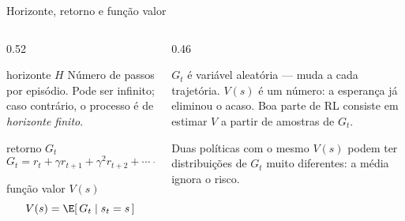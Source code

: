 \documentclass[aspectratio=169, 11pt]{beamer}
\begin{document}
\begin{frame}{Horizonte, retorno e função valor}
  \begin{columns}[T]
    \begin{column}{0.52\textwidth}
      \begin{defbox}[fontupper=\small]{horizonte $H$}
        Número de passos por episódio. Pode ser infinito; caso contrário, o processo é
        de \emph{horizonte finito}.
      \end{defbox}
      \begin{defbox}[fontupper=\small]{retorno $G_t$}
        \vspace{-1.1em}
        \[
          G_t = r_t + \gamma r_{t+1} + \gamma^2 r_{t+2} + \cdots + \gamma^{H-1} r_{t+H-1}
        \]
        \vspace{-1.6em}
      \end{defbox}
      \begin{defbox}[fontupper=\small]{função valor $V(s)$}
        \vspace{-1.1em}
        \[ V(s) = \E[\, G_t \mid s_t = s \,] \]
        \vspace{-1.6em}
      \end{defbox}
    \end{column}
    \begin{column}{0.46\textwidth}
      \begin{ideiabox}
        $G_t$ é variável \alert{aleatória} --- muda a cada trajetória. $V(s)$ é um
        \alert{número}: a esperança já eliminou o acaso. Boa parte de RL consiste em
        estimar $V$ a partir de amostras de $G_t$.
      \end{ideiabox}
      \begin{alertabox}
        Duas políticas com o mesmo $V(s)$ podem ter distribuições de $G_t$ muito
        diferentes: a média ignora o risco.
      \end{alertabox}
    \end{column}
  \end{columns}
\end{frame}
\end{document}
